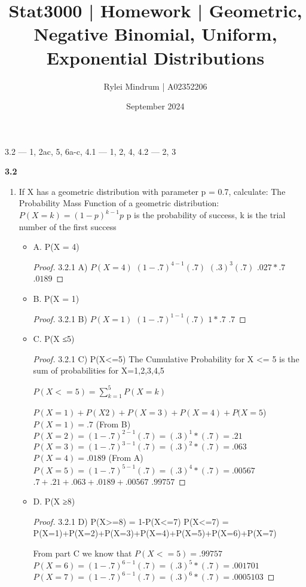 \documentclass{article}
\title{\textbf{Stat3000 | Homework | Geometric, Negative Binomial, Uniform, Exponential Distributions}
}
\author{Rylei Mindrum | A02352206}
\date{September 2024}
\begin{document}
\maketitle


3.2 --- 1, 2ac, 5, 6a-c, 4.1 --- 1, 2, 4, 4.2 --- 2, 3

\textbf{3.2}
    \begin{enumerate}
		\item If X has a geometric distribution with parameter p = 0.7, calculate:
The Probability Mass Function of a geometric distribution: $P(X = k) = (1-p)^{k-1}p$ 
p is the probability of success, k is the trial number of the first success
                \begin{itemize}
                  \item A. P(X = 4)
\begin{proof}
3.2.1 A) 
$P(X=4)$
$(1-.7)^{4-1}(.7)$
$(.3)^{3}(.7)$
$.027*.7$
$.0189$
\end{proof}
                  \item B. P(X = 1)
                  \begin{proof}
3.2.1 B) 
$P(X=1)$
$(1-.7)^{1-1}(.7)$
$1*.7$
$.7$
\end{proof}
                  \item C. P(X ≤5)
                  \begin{proof}
3.2.1 C) 
P(X<=5)
The Cumulative Probability for X <= 5 is the sum of probabilities for X=1,2,3,4,5

$P(X<=5) = \sum_{k=1}^{5} P(X=k)$

$P(X=1)+P(X2)+P(X=3)+P(X=4)+P(X=5$) \\
$P(X=1) = .7$ (From B) \\
$P(X=2) = (1-.7)^{2-1}(.7) = (.3)^{1}*(.7) = .21$ \\
$P(X=3) = (1-.7)^{3-1}(.7) = (.3)^{2}*(.7) = .063$ \\
$P(X=4) = .0189$ (From A) \\
$P(X=5) = (1-.7)^{5-1}(.7) = (.3)^{4}*(.7) = .00567$ \\

$.7+.21+.063+.0189+.00567$
$.99757$
\end{proof}
                  \item  D. P(X ≥8)
                  \begin{proof}
3.2.1 D) 
P(X>=8) = 1-P(X<=7)
P(X<=7) = P(X=1)+P(X=2)+P(X=3)+P(X=4)+P(X=5)+P(X=6)+P(X=7)

From part C we know that 
$P(X<=5)=.99757$
$P(X=6) = (1-.7)^{6-1}(.7) = (.3)^{5}*(.7) = .001701 $
$P(X=7) = (1-.7)^{6-1}(.7) = (.3)^{6}*(.7) = .0005103$


\end{proof}
\end{itemize}
\end{enumerate}
\end{document}

